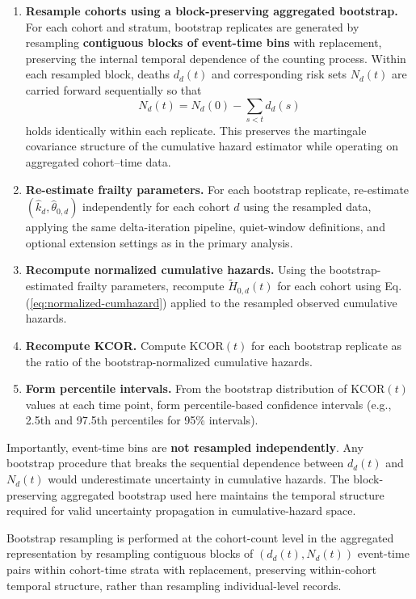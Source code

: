 \documentclass[
]{article}
\begin{document}
\begin{enumerate}
\def\labelenumi{\arabic{enumi}.}
\item
  \textbf{Resample cohorts using a block-preserving aggregated
  bootstrap.}\\
  For each cohort and stratum, bootstrap replicates are generated by
  resampling \textbf{contiguous blocks of event-time bins} with
  replacement, preserving the internal temporal dependence of the
  counting process. Within each resampled block, deaths \(d_d(t)\) and
  corresponding risk sets \(N_d(t)\) are carried forward sequentially so
  that \[
  N_d(t)=N_d(0)-\sum_{s<t} d_d(s)
  \] holds identically within each replicate. This preserves the
  martingale covariance structure of the cumulative hazard estimator
  while operating on aggregated cohort--time data.
\item
  \textbf{Re-estimate frailty parameters.} For each bootstrap replicate,
  re-estimate \((\hat{k}_d,\hat{\theta}_{0,d})\) independently for each
  cohort \(d\) using the resampled data, applying the same
  delta-iteration pipeline, quiet-window definitions, and optional
  extension settings as in the primary analysis.
\item
  \textbf{Recompute normalized cumulative hazards.} Using the
  bootstrap-estimated frailty parameters, recompute
  \(\tilde H_{0,d}(t)\) for each cohort using Eq.
  (\ref{eq:normalized-cumhazard}) applied to the resampled observed
  cumulative hazards.
\item
  \textbf{Recompute KCOR.} Compute \(\mathrm{KCOR}(t)\) for each
  bootstrap replicate as the ratio of the bootstrap-normalized
  cumulative hazards.
\item
  \textbf{Form percentile intervals.} From the bootstrap distribution of
  \(\mathrm{KCOR}(t)\) values at each time point, form percentile-based
  confidence intervals (e.g., 2.5th and 97.5th percentiles for 95\%
  intervals).
\end{enumerate}

Importantly, event-time bins are \textbf{not resampled independently}.
Any bootstrap procedure that breaks the sequential dependence between
\(d_d(t)\) and \(N_d(t)\) would underestimate uncertainty in cumulative
hazards. The block-preserving aggregated bootstrap used here maintains
the temporal structure required for valid uncertainty propagation in
cumulative-hazard space.

Bootstrap resampling is performed at the cohort-count level in the
aggregated representation by resampling contiguous blocks of
\((d_d(t), N_d(t))\) event-time pairs within cohort-time strata with
replacement, preserving within-cohort temporal structure, rather than
resampling individual-level records.
\end{document}
